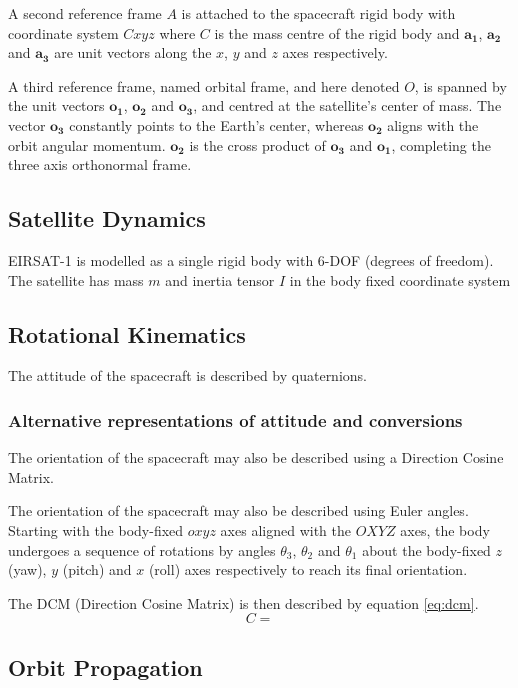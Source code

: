 A second reference frame $A$ is attached to the spacecraft rigid body with coordinate system $Cxyz$ where $C$ is the mass centre of the rigid body and $\mathbf{a_1}$, $\mathbf{a_2}$ and $\mathbf{a_3}$ are unit vectors along the $x$, $y$ and $z$ axes respectively.

A third reference frame, named orbital frame, and here denoted $O$, is spanned by the unit vectors $\mathbf{o_1}$, $\mathbf{o_2}$ and $\mathbf{o_3}$, and centred at the satellite's center of mass. The vector $\mathbf{o_3}$ constantly points to the Earth's center, whereas $\mathbf{o_2}$ aligns with the orbit angular momentum. $\mathbf{o_2}$ is the cross product of $\mathbf{o_3}$ and $\mathbf{o_1}$, completing the three axis orthonormal frame.

\subsection{Satellite Dynamics}

EIRSAT-1 is modelled as a single rigid body with 6-DOF (degrees of freedom).
The satellite has mass $m$ and inertia tensor $I$ in the body fixed coordinate system

\subsection{Rotational Kinematics}

The attitude of the spacecraft is described by quaternions.

\subsubsection{Alternative representations of attitude and conversions}
The orientation of the spacecraft may also be described using a Direction Cosine Matrix.

The orientation of the spacecraft may also be described using Euler angles.
Starting with the body-fixed $oxyz$ axes aligned with the $OXYZ$ axes, the body undergoes a sequence of rotations by angles $\theta_3$, $\theta_2$ and $\theta_1$ about the body-fixed $z$ (yaw), $y$ (pitch) and $x$ (roll) axes respectively to reach its final orientation.

The DCM (Direction Cosine Matrix) is then described by equation \ref{eq:dcm}.
\begin{equation} \label{eq:dcm}
C = 
\end{equation}

\subsection{Orbit Propagation}


